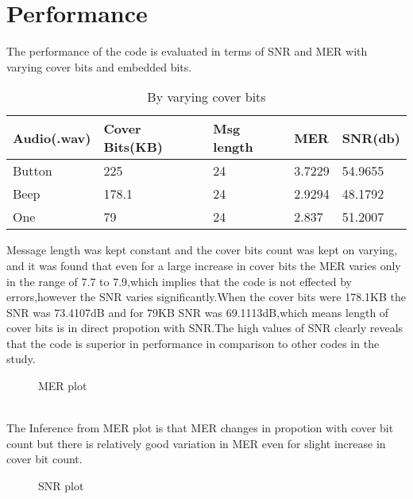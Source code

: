 \documentclass[a4paper, 12pt, notitlepage]{report}
\begin{document}
\section{Performance}

The performance of the code is evaluated in terms of SNR and MER with varying cover bits and embedded bits.\\

\begin{table}[h]
\begin{tabular}{|l|l|l|l|l|}
\hline
\textbf{ Audio(.wav)}&\textbf{Cover Bits(KB)}&\textbf{Msg length}&\textbf{MER}&\textbf{SNR(db)} \\ \hline
 Button&225  &24  &3.7229  &54.9655  \\ \hline
 Beep&178.1  &24  &2.9294  &48.1792  \\ \hline
 One&79  &24  &2.837  &51.2007  \\ \hline
\end{tabular}
\caption{By varying cover bits}
\end{table}

Message length was kept constant and the cover bits count was kept on varying, and it was found that even for a large increase in cover bits the MER varies only in the range of  7.7 to 7.9,which implies that the code is not effected by errors,however the SNR varies significantly.When the cover bits were 178.1KB the SNR was 73.4107dB and for 79KB SNR was 69.1113dB,which means length of cover bits is in direct propotion with SNR.The high values of SNR clearly reveals that the code is superior in performance in comparison to other codes in the study. 

\newpage
\begin{figure}[h!]
{\par}
\caption{MER plot}
\end{figure}\\

The Inference from MER plot is that MER changes in propotion with cover bit count but there is relatively good variation in MER even for slight increase in cover bit count.

\begin{figure}[h!]
{\par}
\caption{SNR plot}
\end{figure}\\
\end{document}
